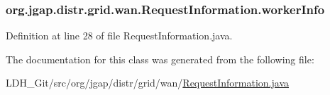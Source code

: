 \hypertarget{classorg_1_1jgap_1_1distr_1_1grid_1_1wan_1_1_request_information_aefecadd291c25ada2325331e5100e67b}{
\subsubsection[{worker\-Info}]{ org.\-jgap.\-distr.\-grid.\-wan.\-Request\-Information.\-worker\-Info}}\label{classorg_1_1jgap_1_1distr_1_1grid_1_1wan_1_1_request_information_aefecadd291c25ada2325331e5100e67b}


Definition at line 28 of file Request\-Information.\-java.



The documentation for this class was generated from the following file\-:\begin{DoxyCompactItemize}
\item 
L\-D\-H\-\_\-\-Git/src/org/jgap/distr/grid/wan/\hyperlink{_request_information_8java}{Request\-Information.\-java}\end{DoxyCompactItemize}
